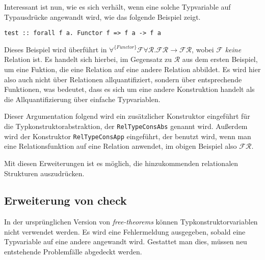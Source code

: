 Interessant ist nun, wie es sich verhält, wenn eine solche Typvariable auf Typausdrücke angewandt wird, wie das folgende
Beispiel zeigt.

\begin{verbatim}
test :: forall f a. Functor f => f a -> f a
\end{verbatim}

Dieses Beispiel wird überführt in $\forall^{\{Functor\}} \mathcal{F} \forall \mathcal{R}. \mathcal{F} \mathcal{R} \rightarrow
\mathcal{F} \mathcal{R}$, wobei $\mathcal{F}$ \textit{keine} Relation ist. Es handelt sich hierbei, im Gegensatz zu $\mathcal{R}$ aus
dem ersten Beispiel, um eine Fuktion, die eine Relation auf eine andere Relation abbildet. Es wird hier also auch nicht über
Relationen allquantifiziert, sondern über entsprechende Funktionen, was bedeutet, dass es sich um eine andere Konstruktion
handelt als die Allquantifizierung über einfache Typvariablen.

Dieser Argumentation folgend wird ein zusätzlicher Konstruktor eingeführt für die Typkonstruktorabstraktion, der
\texttt{RelTypeConsAbs} genannt wird. Außerdem wird der Konstruktor \texttt{RelTypeConsApp} eingeführt, der benutzt
wird, wenn man eine Relationsfunktion auf eine Relation anwendet, im obigen Beispiel also $\mathcal{F} \mathcal{R}$.

Mit diesen Erweiterungen ist es möglich, die hinzukommenden relationalen Strukturen auszudrücken.


\subsection{Erweiterung von check}


In der ursprünglichen Version von \textit{free-theorems} können Typkonstruktorvariablen nicht verwendet werden. Es wird eine
Fehlermeldung ausgegeben, sobald eine Typvariable auf eine andere angewandt wird. Gestattet man dies, müssen neu
entstehende Problemfälle abgedeckt werden.


